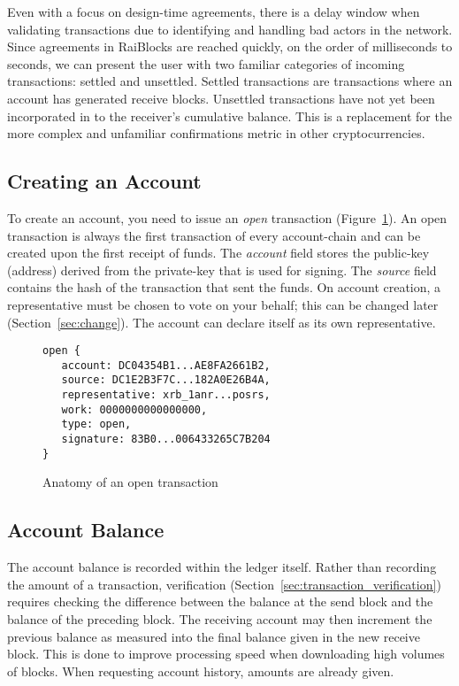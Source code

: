 Even with a focus on design-time agreements, there is a delay window when validating transactions due to identifying and handling bad actors in the network. Since agreements in RaiBlocks are reached quickly, on the order of milliseconds to seconds, we can present the user with two familiar categories of incoming transactions: settled and unsettled. Settled transactions are transactions where an account has generated receive blocks. Unsettled transactions have not yet been incorporated in to the receiver's cumulative balance. This is a replacement for the more complex and unfamiliar confirmations metric in other cryptocurrencies.

\subsection{Creating an Account}\label{sec:open}
To create an account, you need to issue an \textit{open} transaction (Figure~\ref{code:open}). An open transaction is always the first transaction of every account-chain and can be created upon the first receipt of funds. The \textit{account} field stores the public-key (address) derived from the private-key that is used for signing. The \textit{source} field contains the hash of the transaction that sent the funds. On account creation, a representative must be chosen to vote on your behalf; this can be changed later (Section~\ref{sec:change}). The account can declare itself as its own representative.

\begin{figure}[!ht]
\begin{lstlisting}
open {
   account: DC04354B1...AE8FA2661B2,
   source: DC1E2B3F7C...182A0E26B4A,
   representative: xrb_1anr...posrs,
   work: 0000000000000000,
   type: open,
   signature: 83B0...006433265C7B204
}
\end{lstlisting}
\caption{Anatomy of an open transaction}
\label{code:open}
\end{figure}

\subsection{Account Balance}\label{sec:account_balance}
The account balance is recorded within the ledger itself. Rather than recording the amount of a transaction, verification (Section~\ref{sec:transaction_verification}) requires checking the difference between the balance at the send block and the balance of the preceding block. The receiving account may then increment the previous balance as measured into the final balance given in the new receive block. This is done to improve processing speed when downloading high volumes of blocks. When requesting account history, amounts are already given.

